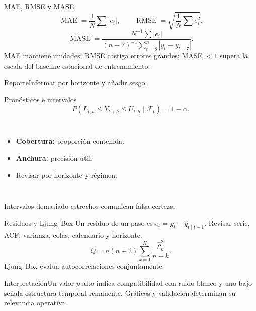 \documentclass[aspectratio=169,10pt]{beamer}
\newcommand{\concepto}[1]{\textcolor{UAPTeal}{\textbf{#1}}}
\begin{document}
\begin{frame}{MAE, RMSE y MASE}\small
\[\operatorname{MAE}=\frac1N\sum|e_i|,\qquad \operatorname{RMSE}=\sqrt{\frac1N\sum e_i^2}.\]
\[\operatorname{MASE}=\frac{N^{-1}\sum|e_i|}{(n-7)^{-1}\sum_{t=8}^{n}|y_t-y_{t-7}|}.\]
MAE mantiene unidades; RMSE castiga errores grandes; MASE $<1$ supera la escala del baseline estacional de entrenamiento.
\begin{block}{Reporte}Informar por horizonte y añadir sesgo.\end{block}
\end{frame}

\begin{frame}{Pronósticos e intervalos}\small
\[P(L_{t,h}\le Y_{t+h}\le U_{t,h}\mid\mathcal F_t)=1-\alpha.\]
\begin{columns}[T]\begin{itemize}\item \concepto{Cobertura:} proporción contenida.\item \concepto{Anchura:} precisión útil.\item Revisar por horizonte y régimen.\end{itemize}\centering
{}\end{columns}
Intervalos demasiado estrechos comunican falsa certeza.
\end{frame}

\begin{frame}{Residuos y Ljung--Box}\small
Un residuo de un paso es $e_t=y_t-\widehat y_{t\mid t-1}$. Revisar serie, ACF, varianza, colas, calendario y horizonte.
\[Q=n(n+2)\sum_{k=1}^{H}\frac{\widehat\rho_k^2}{n-k}.\]
Ljung--Box evalúa autocorrelaciones conjuntamente.
\begin{alertblock}{Interpretación}Un valor $p$ alto indica compatibilidad con ruido blanco y uno bajo señala estructura temporal remanente. Gráficos y validación determinan su relevancia operativa.\end{alertblock}
\end{frame}
\end{document}
